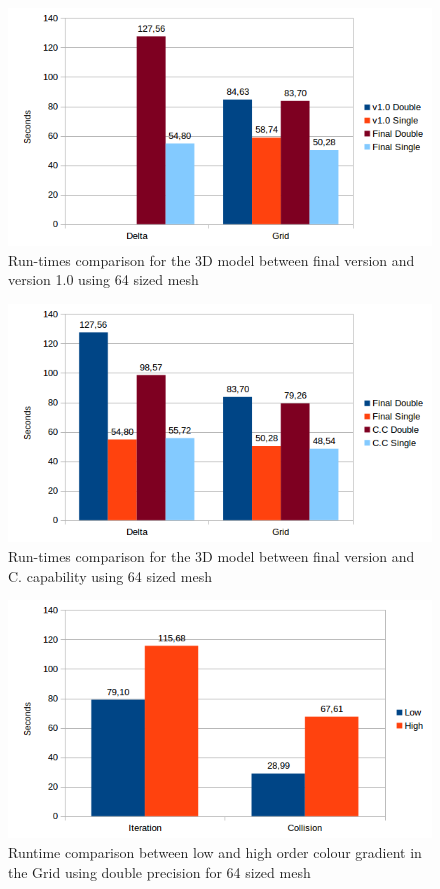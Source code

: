 \documentclass[12pt, openany]{book}
\begin{document}
        \begin{figure}[H]
        	\centering
        	\includegraphics[width=\linewidth]{Resources/Images/vfv3d64.png}
        	\caption{Run-times comparison for the 3D model between final version and version 1.0 using 64 sized mesh}
        	\label{fig:vfv3d64}
        \end{figure}
            \begin{figure}[H]
            	\centering
            	\includegraphics[width=\linewidth]{Resources/Images/cc3d64.png}
            	\caption{Run-times comparison for the 3D model between final version and C. capability using 64 sized mesh}
            	\label{fig:cc3d64}
            \end{figure}
            
              \begin{figure}[H]
              	\centering
              	\includegraphics[width=\linewidth]{Resources/Images/high64.png}
              	\caption{Runtime comparison between low and high order colour gradient in the Grid using double precision for 64 sized mesh}
              	\label{fig:high64}
              \end{figure}
\end{document}
